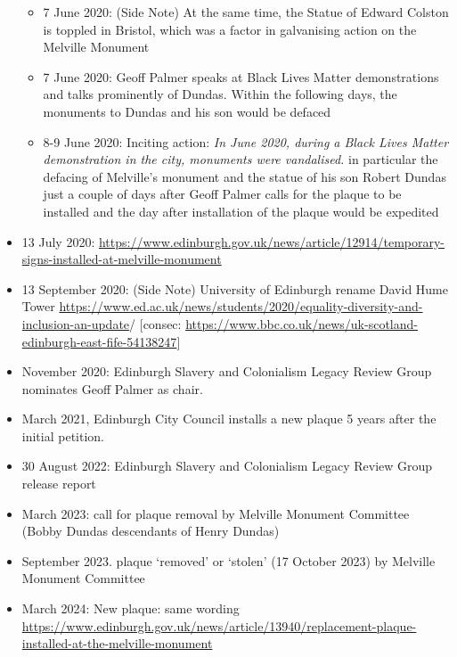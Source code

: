 \documentclass{scrartcl}
\begin{document}
\begin{itemize}
\begin{itemize}
        \item 7 June 2020: (Side Note) At the same time, the Statue of Edward Colston is toppled in Bristol, which was a factor in galvanising action on the Melville Monument 
        \item 7 June 2020: Geoff Palmer speaks at Black Lives Matter demonstrations and talks prominently of Dundas. Within the following days, the monuments to Dundas and his son would be defaced \cite{hay_2020_3}\cite{youtube_2020,reporter_2020} 
        \item 8-9 June 2020: Inciting action: \textit{In June 2020, during a Black Lives Matter demonstration in the city, monuments were vandalised.}\cite{anderson_2021}  in particular the defacing of Melville's monument and the statue of his son Robert Dundas \cite{hay_2020_3} just a couple of days after Geoff Palmer calls for the plaque to be installed \cite{hay_2020_1} and the day after installation of the plaque would be expedited \cite{hoffman_2020, daily_2020}
    \end{itemize}
    \item 13 July 2020: \url{https://www.edinburgh.gov.uk/news/article/12914/temporary-signs-installed-at-melville-monument}
    \item 13 September 2020: (Side Note) University of Edinburgh rename David Hume Tower \url{https://www.ed.ac.uk/news/students/2020/equality-diversity-and-inclusion-an-update}/ [consec: \url{https://www.bbc.co.uk/news/uk-scotland-edinburgh-east-fife-54138247}]
    \item November 2020: Edinburgh Slavery and Colonialism Legacy Review Group nominates Geoff Palmer as chair.
    \item March 2021, Edinburgh City Council  installs a new plaque  \cite{mccarthy_2022_1}\cite{anderson_2021} 5 years after the initial petition.
    \item 30 August 2022: Edinburgh Slavery and Colonialism Legacy Review Group release report
    \item March 2023: call for plaque removal by Melville Monument Committee (Bobby Dundas descendants of Henry Dundas)  \cite{bbc_2023_1}
    \item September 2023. plaque `removed' or `stolen' (17 October 2023)  by Melville Monument Committee \cite{bbc_2023_2,bbc_2024}
    \item March 2024: New plaque: same wording \cite{bbc_2024} \url{https://www.edinburgh.gov.uk/news/article/13940/replacement-plaque-installed-at-the-melville-monument}
\end{itemize}
\end{document}
